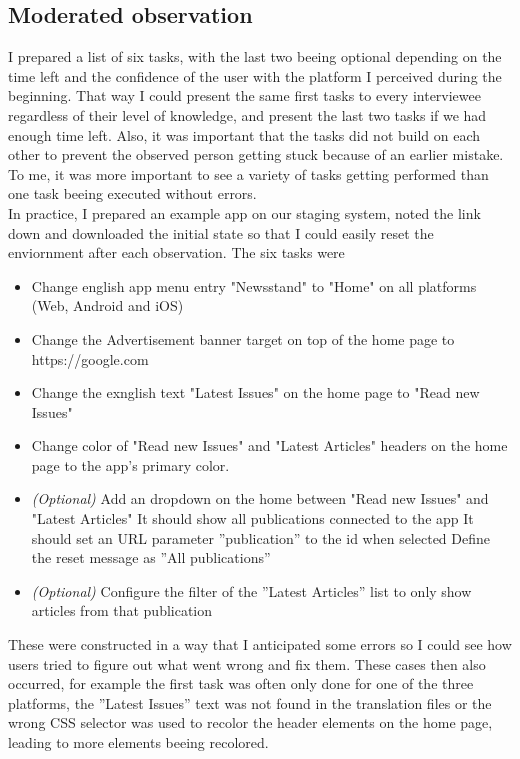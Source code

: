 \subsection{Moderated observation}
\label{subsec:modobs}
I prepared a list of six tasks, with the last two beeing optional depending on the time left and the confidence of the user with the platform I perceived during the beginning.
That way I could present the same first tasks to every interviewee regardless of their level of knowledge, and present the last two tasks if we had enough time left.
Also, it was important that the tasks did not build on each other to prevent the observed person getting stuck because of an earlier mistake.
To me, it was more important to see a variety of tasks getting performed than one task beeing executed without errors. 
\\
In practice, I prepared an example app on our staging system, noted the link down and downloaded the initial state so that I could easily reset the enviornment after each observation.
The six tasks were
\begin{itemize}
  \item Change english app menu entry "Newsstand" to "Home" on all platforms (Web, Android and iOS)
  \item Change the Advertisement banner target on top of the home page to https://google.com 
  \item Change the exnglish text "Latest Issues" on the home page to "Read new Issues"
  \item Change color of "Read new Issues" and "Latest Articles" headers on the home page to the app's primary color.
  \item \textit{(Optional)} Add an dropdown on the home between "Read new Issues" and "Latest Articles"
    \subitem It should show all publications connected to the app
    \subitem It should set an URL parameter ''publication'' to the id when selected
    \subitem Define the reset message as ''All publications''
  \item \textit{(Optional)} Configure the filter of the ''Latest Articles'' list to only show articles from that publication
\end{itemize}

These were constructed in a way that I anticipated some errors so I could see how users tried to figure out what went wrong and fix them.
These cases then also occurred, for example the first task was often only done for one of the three platforms, the ''Latest Issues'' text was not found in the translation files or
the wrong CSS selector was used to recolor the header elements on the home page, leading to more elements beeing recolored.

